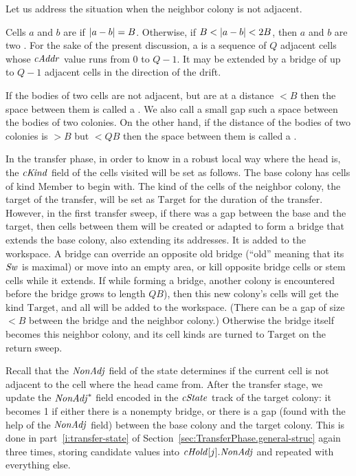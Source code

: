\documentclass[12pt]{memoir}
\newcommand{\fld}[1]{\ensuremath{\textit{#1\/}}}
\def\B{B}
\newcommand{\Q}{Q}
\newcommand{\cAddr}{\fld{cAddr}}
\newcommand{\NonAdj}{\fld{NonAdj}}
\newcommand{\cHold}{\fld{cHold}}
\newcommand{\cKind}{\fld{cKind}}
\newcommand{\cState}{\fld{cState}}
\newcommand{\Sweep}{\fld{Sw}}
\newcommand{\Member}{\mathrm{Member}}
\newcommand{\Target}{\mathrm{Target}}
\begin{document}
Let us address the situation when the neighbor colony is not adjacent.

\begin{definition}\label{def:adjacent}
  Cells \( a \) and \( b \) are  if \( \abs{a-b}=\B \).
  Otherwise, if \( \B < \abs{a- b} < 2\B \), then
  \( a \) and \( b \) are two .
For the sake of the present discussion, a  is a sequence of \( \Q \) adjacent
cells whose \( \cAddr \) value runs from \( 0 \) to \( \Q-1 \).
It may be extended by a bridge of up to \( \Q-1 \) adjacent cells in the direction of the drift.

If the bodies of two cells are not adjacent, but are at a distance \( <\B \) then the space
between them is called a .
We also call a small gap such a space between the bodies of two colonies.
On the other hand, if the distance of the bodies of two colonies is \( >\B \) 
but \( <\Q\B \) then the space between them is called a .
\end{definition}

In the transfer phase, in order to know in a robust local way where the head is,
the \( \cKind \) field of the cells visited will be set as follows.
The base colony has cells of kind \( \Member \) to begin with.
The kind of the cells of the neighbor colony, the target of the transfer, will be set
as \( \Target \) for the duration of the transfer.
However, in the first transfer sweep, if there was a gap between the base and
the target, then cells between them will be created or adapted to form
a bridge that extends the base colony, also extending its addresses.
It is added to the workspace.
A bridge can override an opposite old bridge (``old'' meaning 
that its \( \Sweep \) is maximal) or move 
into an empty area, or kill opposite bridge cells or stem cells while it extends.
If while forming a bridge, another colony is encountered before
the bridge grows to length \( \Q\B \)), then this new colony's cells will get the 
kind \( \Target \), and all will be added to the workspace.
(There can be a gap of size \( <\B \) between the bridge and the neighbor colony.)
Otherwise the bridge itself becomes this neighbor colony, and its cell kinds are
turned to \( \Target \) on the return sweep.

Recall that the \( \NonAdj \) field of the state determines
if the current cell is not adjacent to the cell  where the head came from.
After the transfer stage, we update the \( \NonAdj^{*} \) field encoded in the
\( \cState \) track of the target colony: it becomes 1 if either there is a nonempty bridge,
or there is a gap (found with the help of the \( \NonAdj \) field) between the base colony
and the target colony.
This is done in part~\ref{i:transfer-state} 
of Section~\ref{sec:TransferPhase.general-struc}
again three times, storing candidate values into \( \cHold[j].\NonAdj \)
and repeated with everything else.
\end{document}
